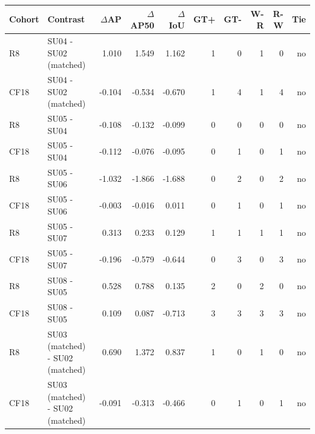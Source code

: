 \begin{tabular}{llrrrrrrrr}
\toprule
Cohort & Contrast & $\Delta$AP & $\Delta$AP50 & $\Delta$IoU & GT+ & GT- & W-R & R-W & Tie \\
\midrule
R8 & SU04 - SU02 (matched) & 1.010 & 1.549 & 1.162 & 1 & 0 & 1 & 0 & no \\
CF18 & SU04 - SU02 (matched) & -0.104 & -0.534 & -0.670 & 1 & 4 & 1 & 4 & no \\
R8 & SU05 - SU04 & -0.108 & -0.132 & -0.099 & 0 & 0 & 0 & 0 & no \\
CF18 & SU05 - SU04 & -0.112 & -0.076 & -0.095 & 0 & 1 & 0 & 1 & no \\
R8 & SU05 - SU06 & -1.032 & -1.866 & -1.688 & 0 & 2 & 0 & 2 & no \\
CF18 & SU05 - SU06 & -0.003 & -0.016 & 0.011 & 0 & 1 & 0 & 1 & no \\
R8 & SU05 - SU07 & 0.313 & 0.233 & 0.129 & 1 & 1 & 1 & 1 & no \\
CF18 & SU05 - SU07 & -0.196 & -0.579 & -0.644 & 0 & 3 & 0 & 3 & no \\
R8 & SU08 - SU05 & 0.528 & 0.788 & 0.135 & 2 & 0 & 2 & 0 & no \\
CF18 & SU08 - SU05 & 0.109 & 0.087 & -0.713 & 3 & 3 & 3 & 3 & no \\
R8 & SU03 (matched) - SU02 (matched) & 0.690 & 1.372 & 0.837 & 1 & 0 & 1 & 0 & no \\
CF18 & SU03 (matched) - SU02 (matched) & -0.091 & -0.313 & -0.466 & 0 & 1 & 0 & 1 & no \\
\bottomrule
\end{tabular}
